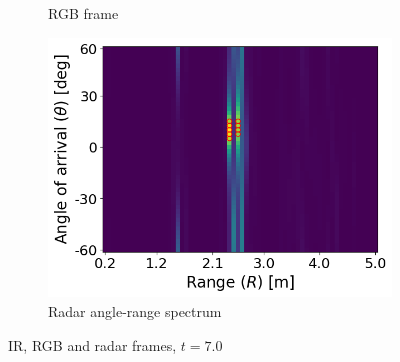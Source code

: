 \begin{figure}
\begin{subfigure}[t]{0.3\textwidth}
        \caption{RGB frame}
    \end{subfigure}
    \hfill
    \begin{subfigure}[t]{0.3\textwidth}
        \includegraphics[width=\textwidth]{fig/5/radar_t_7.0.png}
        \caption{Radar angle-range spectrum}
    \end{subfigure}
    \caption{IR, RGB and radar frames, $t = 7.0$}
    \label{fig:5-frames-1}
\end{figure}

